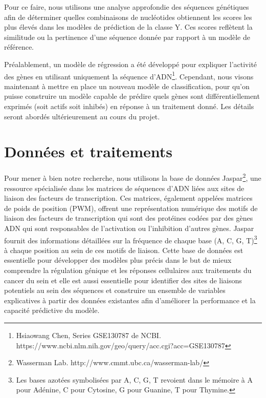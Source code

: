 \documentclass[mstat,12pt]{unswthesis}
\begin{document}
\bigskip

Pour ce faire, nous utilisons une analyse approfondie des séquences
génétiques afin de déterminer quelles combinaisons de nucléotides
obtiennent les scores les plus élevés dans les modèles de prédiction de
la classe Y. Ces scores reflètent la similitude ou la pertinence d'une
séquence donnée par rapport à un modèle de référence.

\bigskip

Préalablement, un modèle de régression a été développé pour expliquer
l'activité des gènes en utilisant uniquement la séquence
d'ADN\footnote{ Hsiaowang Chen, Series GSE130787 de NCBI. \newline https://www.ncbi.nlm.nih.gov/geo/query/acc.cgi?acc=GSE130787}.
Cependant, nous visons maintenant à mettre en place un nouveau modèle de
classification, pour qu'on puisse construire un modèle capable de
prédire quels gènes sont différentiellement exprimés (soit actifs soit
inhibés) en réponse à un traitement donné. Les détails seront abordés
ultérieurement au cours du projet.

\hypertarget{donnuxe9es-et-traitements}{%
\chapter{Données et traitements}\label{donnuxe9es-et-traitements}}

Pour mener à bien notre recherche, nous utilisons la base de données
Jaspar\footnote{ Wasserman Lab. http://www.cmmt.ubc.ca/wasserman-lab/},
une ressource spécialisée dans les matrices de séquences d'ADN liées aux
sites de liaison des facteurs de transcription. Ces matrices, également
appelées matrices de poids de position (PWM), offrent une représentation
numérique des motifs de liaison des facteurs de transcription qui sont
des protéines codées par des gènes ADN qui sont responsables de
l'activation ou l'inhibition d'autres gènes. Jaspar fournit des
informations détaillées sur la fréquence de chaque base (A, C, G,
T)\footnote{ Les bases azotées symbolisées par A, C, G, T revoient dans le mémoire à A pour Adénine, C pour Cytosine, G pour Guanine, T pour Thymine.}
à chaque position au sein de ces motifs de liaison. Cette base de
données est essentielle pour développer des modèles plus précis dans le
but de mieux comprendre la régulation génique et les réponses
cellulaires aux traitements du cancer du sein et elle est aussi
essentielle pour identifier des sites de liaisons potentiels au sein des
séquences et construire un ensemble de variables explicatives à partir
des données existantes afin d'améliorer la performance et la capacité
prédictive du modèle.
\end{document}
